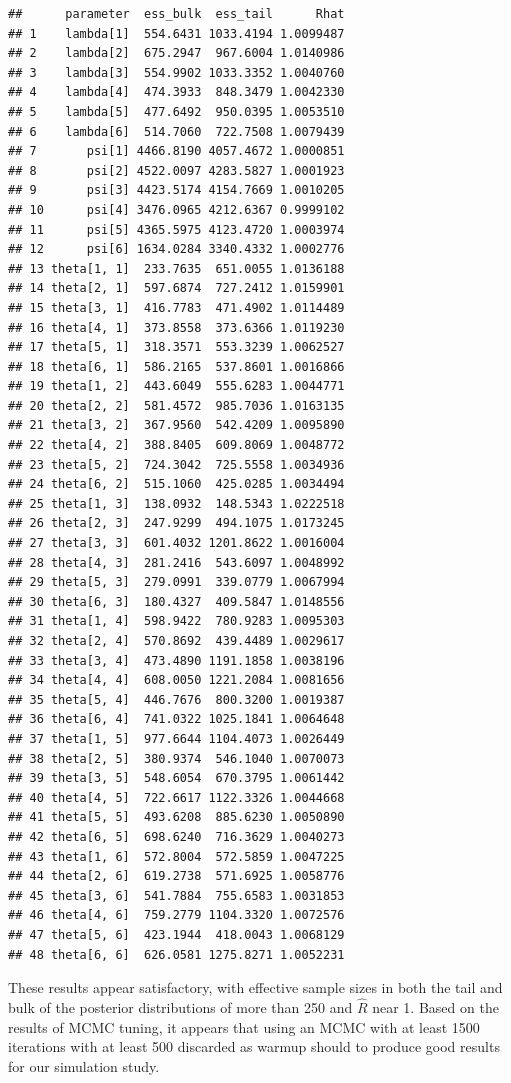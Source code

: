 \documentclass[
]{article}
\begin{document}
\begin{verbatim}
##      parameter  ess_bulk  ess_tail      Rhat
## 1    lambda[1]  554.6431 1033.4194 1.0099487
## 2    lambda[2]  675.2947  967.6004 1.0140986
## 3    lambda[3]  554.9902 1033.3352 1.0040760
## 4    lambda[4]  474.3933  848.3479 1.0042330
## 5    lambda[5]  477.6492  950.0395 1.0053510
## 6    lambda[6]  514.7060  722.7508 1.0079439
## 7       psi[1] 4466.8190 4057.4672 1.0000851
## 8       psi[2] 4522.0097 4283.5827 1.0001923
## 9       psi[3] 4423.5174 4154.7669 1.0010205
## 10      psi[4] 3476.0965 4212.6367 0.9999102
## 11      psi[5] 4365.5975 4123.4720 1.0003974
## 12      psi[6] 1634.0284 3340.4332 1.0002776
## 13 theta[1, 1]  233.7635  651.0055 1.0136188
## 14 theta[2, 1]  597.6874  727.2412 1.0159901
## 15 theta[3, 1]  416.7783  471.4902 1.0114489
## 16 theta[4, 1]  373.8558  373.6366 1.0119230
## 17 theta[5, 1]  318.3571  553.3239 1.0062527
## 18 theta[6, 1]  586.2165  537.8601 1.0016866
## 19 theta[1, 2]  443.6049  555.6283 1.0044771
## 20 theta[2, 2]  581.4572  985.7036 1.0163135
## 21 theta[3, 2]  367.9560  542.4209 1.0095890
## 22 theta[4, 2]  388.8405  609.8069 1.0048772
## 23 theta[5, 2]  724.3042  725.5558 1.0034936
## 24 theta[6, 2]  515.1060  425.0285 1.0034494
## 25 theta[1, 3]  138.0932  148.5343 1.0222518
## 26 theta[2, 3]  247.9299  494.1075 1.0173245
## 27 theta[3, 3]  601.4032 1201.8622 1.0016004
## 28 theta[4, 3]  281.2416  543.6097 1.0048992
## 29 theta[5, 3]  279.0991  339.0779 1.0067994
## 30 theta[6, 3]  180.4327  409.5847 1.0148556
## 31 theta[1, 4]  598.9422  780.9283 1.0095303
## 32 theta[2, 4]  570.8692  439.4489 1.0029617
## 33 theta[3, 4]  473.4890 1191.1858 1.0038196
## 34 theta[4, 4]  608.0050 1221.2084 1.0081656
## 35 theta[5, 4]  446.7676  800.3200 1.0019387
## 36 theta[6, 4]  741.0322 1025.1841 1.0064648
## 37 theta[1, 5]  977.6644 1104.4073 1.0026449
## 38 theta[2, 5]  380.9374  546.1040 1.0070073
## 39 theta[3, 5]  548.6054  670.3795 1.0061442
## 40 theta[4, 5]  722.6617 1122.3326 1.0044668
## 41 theta[5, 5]  493.6208  885.6230 1.0050890
## 42 theta[6, 5]  698.6240  716.3629 1.0040273
## 43 theta[1, 6]  572.8004  572.5859 1.0047225
## 44 theta[2, 6]  619.2738  571.6925 1.0058776
## 45 theta[3, 6]  541.7884  755.6583 1.0031853
## 46 theta[4, 6]  759.2779 1104.3320 1.0072576
## 47 theta[5, 6]  423.1944  418.0043 1.0068129
## 48 theta[6, 6]  626.0581 1275.8271 1.0052231
\end{verbatim}

\linespread{1}

These results appear satisfactory, with effective sample sizes in both the tail and bulk of the posterior distributions of more than 250 and \(\hat{R}\) near 1. Based on the results of MCMC tuning, it appears that using an MCMC with at least 1500 iterations with at least 500 discarded as warmup should to produce good results for our simulation study.
\end{document}
